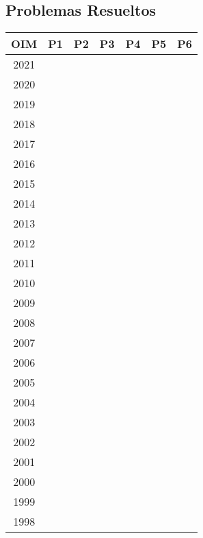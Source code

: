 \documentclass[11pt]{scrartcl}
\begin{document}
    \subsection*{Problemas Resueltos}
    \begin{center} 
        \begin{tabular}{| c | c | c | c | c | c | c |}
            \hline
            OIM & P1 & P2 & P3 & P4 & P5 & P6 \\
            \hline
            2021 & & & & & & \\
            \hline
            2020 & & & & & & \\
            \hline
            2019 & & & & & & \\
            \hline
            2018 & & & & & & \\
            \hline
            2017 & & & & & & \\
            \hline
            2016 & & & & & & \\
            \hline
            2015 & & & & & & \\
            \hline
            2014 & & & & & & \\
            \hline
            2013 & & & & & & \\
            \hline
            2012 & & & & & & \\
            \hline
            2011 & & & & & & \\
            \hline
            2010 & & & & & & \\
            \hline
            2009 & & & & & & \\
            \hline
            2008 & & & & & & \\
            \hline
            2007 & & & & & & \\
            \hline
            2006 & & & & & & \\
            \hline
            2005 & & & & & & \\
            \hline
            2004 & & & & & & \\
            \hline
            2003 & & & & & & \\
            \hline
            2002 & & & & & & \\
            \hline
            2001 & & & & & & \\
            \hline
            2000 & & & & & & \\
            \hline
            1999 & & & & & & \\
            \hline
            1998 & & & & & & \\

\end{tabular}
\end{center}
\end{document}
